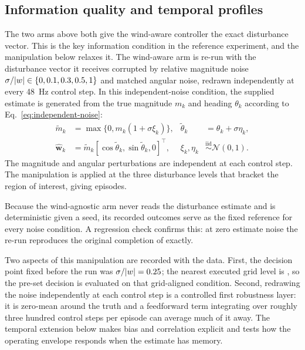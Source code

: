 \subsection{Information quality and temporal profiles}

The two arms above both give the wind-aware controller the exact disturbance
vector. This is the key information condition in the reference experiment, and
the manipulation below relaxes it. The wind-aware arm is re-run with the
disturbance vector it receives corrupted by relative magnitude noise
$\sigma/|w| \in \{0, 0.1, 0.3, 0.5, 1\}$ and matched angular noise, redrawn
independently at every 48~Hz control step. In this independent-noise condition,
the supplied estimate is generated from the true magnitude $m_k$ and heading
$\theta_k$ according to Eq.~\eqref{eq:independent-noise}:
\begin{equation}
  \begin{aligned}
  \widetilde m_k&=\max\{0,m_k(1+\sigma\xi_k)\},&
  \widetilde\theta_k&=\theta_k+\sigma\eta_k,\\
  \widehat{\mathbf w}_k&=\widetilde m_k
  [\cos\widetilde\theta_k,\sin\widetilde\theta_k,0]^{\top},&
  \xi_k,\eta_k&\stackrel{\mathrm{iid}}{\sim}\mathcal{N}(0,1).
  \end{aligned}
  \label{eq:independent-noise}
\end{equation}
The magnitude and angular perturbations are independent at each control step.
The manipulation is applied at the three disturbance levels that bracket the
region of interest, giving \NEpisodesNoise{} episodes.

Because the wind-agnostic arm never reads the disturbance estimate and is
deterministic given a seed, its recorded outcomes serve as the fixed reference for
every noise condition. A regression check confirms this: at zero estimate noise the
re-run reproduces the original completion of \SigmaZeroAware{} exactly.

Two aspects of this manipulation are recorded with the data. First, the decision
point fixed before the run was $\sigma/|w| = 0.25{}$; the nearest executed
grid level is \NearestSigma{}, so the pre-set decision is evaluated on that
grid-aligned condition. Second, redrawing the noise
independently at each control step is a controlled first robustness layer: it is
zero-mean around the truth and a feedforward term integrating over roughly three
hundred control steps per episode can average much of it away. The temporal
extension below makes bias and correlation explicit and tests how the operating
envelope responds when the estimate has memory.

